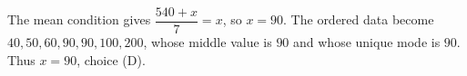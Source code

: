 The mean condition gives $\dfrac{540+x}{7}=x$, so $x=90$. The ordered data become $40,50,60,90,90,100,200$, whose middle value is $90$ and whose unique mode is $90$. Thus $\boxed{x=90}$, choice (D).

